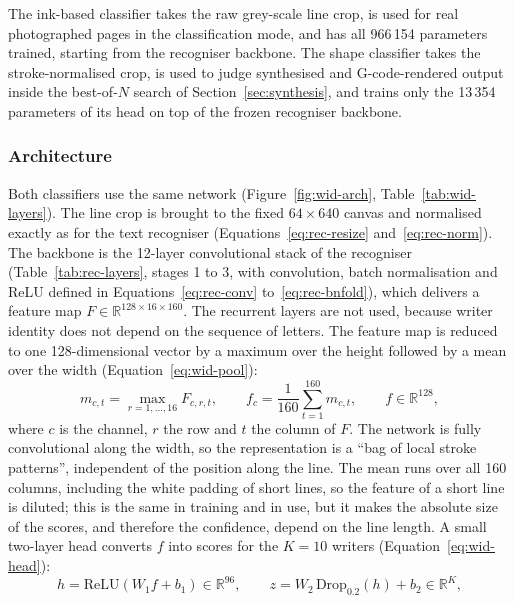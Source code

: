 The ink-based classifier takes the raw grey-scale line crop, is used for real photographed pages in the classification mode, and has all 966\,154 parameters trained, starting from the recogniser backbone.
The shape classifier takes the stroke-normalised crop, is used to judge synthesised and G-code-rendered output inside the best-of-$N$ search of Section~\ref{sec:synthesis}, and trains only the 13\,354 parameters of its head on top of the frozen recogniser backbone.

\subsubsection{Architecture}

Both classifiers use the same network (Figure~\ref{fig:wid-arch}, Table~\ref{tab:wid-layers}).
The line crop is brought to the fixed $64\times640$ canvas and normalised exactly as for the text recogniser (Equations~\ref{eq:rec-resize} and~\ref{eq:rec-norm}).
The backbone is the 12-layer convolutional stack of the recogniser (Table~\ref{tab:rec-layers}, stages 1 to 3, with convolution, batch normalisation and ReLU defined in Equations~\ref{eq:rec-conv} to~\ref{eq:rec-bnfold}), which delivers a feature map $F\in\mathbb R^{128\times16\times160}$.
The recurrent layers are not used, because writer identity does not depend on the sequence of letters.
The feature map is reduced to one 128-dimensional vector by a maximum over the height followed by a mean over the width (Equation~\ref{eq:wid-pool}):
\begin{equation}
m_{c,t}=\max_{r=1,\ldots,16}F_{c,r,t},\qquad f_c=\frac1{160}\sum_{t=1}^{160}m_{c,t},\qquad f\in\mathbb R^{128},
\label{eq:wid-pool}
\end{equation}
where $c$ is the channel, $r$ the row and $t$ the column of $F$.
The network is fully convolutional along the width, so the representation is a ``bag of local stroke patterns'', independent of the position along the line.
The mean runs over all 160 columns, including the white padding of short lines, so the feature of a short line is diluted; this is the same in training and in use, but it makes the absolute size of the scores, and therefore the confidence, depend on the line length.
A small two-layer head converts $f$ into scores for the $K=10$ writers (Equation~\ref{eq:wid-head}):
\begin{equation}
h=\mathrm{ReLU}(W_1f+b_1)\in\mathbb R^{96},\qquad z=W_2\,\mathrm{Drop}_{0.2}(h)+b_2\in\mathbb R^{K},
\label{eq:wid-head}
\end{equation}
